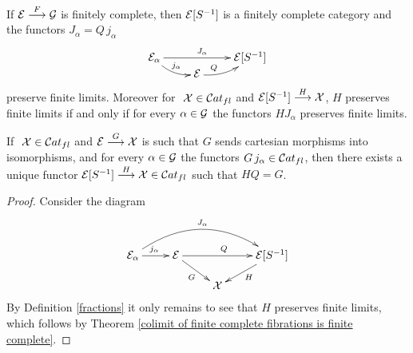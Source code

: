 \begin{theorem}\label{colimit of finite complete fibrations is finite complete}
If $\mathcal{E} \overset {F} {\longrightarrow} \mathcal{G}$ is finitely complete, then $\mathcal{E}[S^{-1}]$ is a finitely complete category and the functors $J_\alpha = Q \, j_\alpha$
%
$$
\xymatrix@R=0ex
     {
      \cc{E}_\alpha  \ar@/_0.5pc/[dr]^{j_\alpha} 
                     \ar[rr]^{J_\alpha} 
   && \cc{E}[S^{-1}]
  \\ 
    & \cc{E} \ar@/_0.5pc/[ur]^<(0.21)Q %
     }		
$$
%
preserve finite limits. Moreover for $\ \mathcal{X} \in \mathcal{C}at_{fl}$  and 
${\mathcal{E}[S^{-1}] \overset {H} {\longrightarrow} \mathcal{X}}$, $H$ preserves finite limits if and only if  for every ${\alpha \in \mathcal{G}}$ the functors 
$H J_\alpha$ preserves finite limits. \cqd
\end{theorem}
% 
\begin{comment}
$$
\xymatrix@+2ex@1 
    {
  & \cc{E}[S^{-1}] \ar[r]^H 
                    \ar@{}[dr]|(.3)\equiv & \cc{I} 
 \\
   & \cc{E} \ar@{}[l]|(.35)\equiv 
            \ar[u]^Q \ar[ur]_G 
    & 
  \\
    & \cc{E}_\alpha 
             \ar@/^3pc/[uu]^{J_\alpha} 
             \ar[u]_{j_\alpha}
     } 
$$
\end{comment}
%
\begin{corollary} \label{buena restriccion a finite complete}
If $\ \mathcal{X} \in \mathcal{C}at_{fl}$ and ${\mathcal{E} \overset {G} {\longrightarrow} \mathcal{X}}$ is such that $G$ sends cartesian morphisms into isomorphisms, and for every 
${\alpha \in \mathcal{G}}$ the functors $G \, j_\alpha \in \mathcal{C}at_{fl}$, then there exists a unique functor ${\mathcal{E}[S^{-1}] \overset {H} {\longrightarrow} \mathcal{X}} \in \mathcal{C}at_{fl}$ such that $H Q = G$.
\end{corollary}
\begin{proof}
Consider the diagram
$$
\xymatrix@R=3ex
    {
     \cc{E}_\alpha \ar@/^2pc/[rrr]^{J_\alpha}
                   \ar[r]^{j_\alpha}
   & \cc{E} \ar[rr]^Q
            \ar[dr]_G
  && \cc{E}[S^{-1}] \ar[dl]^H
 \\
  && \cc{X}
     }
$$
By Definition \ref{fractions} it only remains to see that $H$ preserves finite limits, which follows by Theorem \ref{colimit of finite complete fibrations is finite complete}.
\end{proof}

